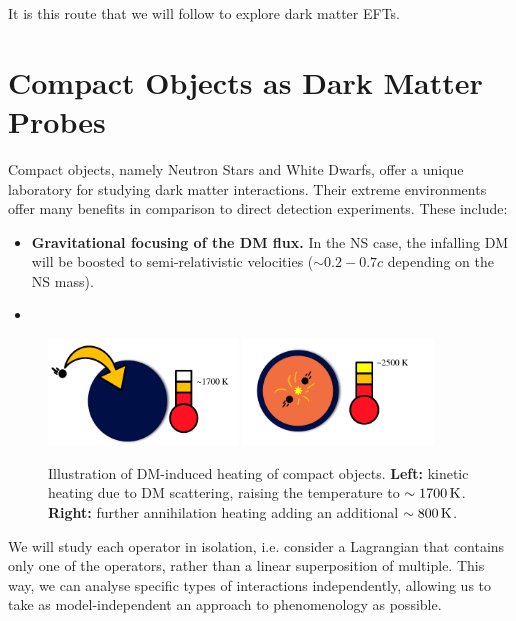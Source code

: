 It is this route that we will follow to explore dark matter EFTs.

\section{Compact Objects as Dark Matter Probes}


Compact objects, namely Neutron Stars and White Dwarfs, offer a unique
laboratory for studying dark matter interactions. Their extreme environments
offer many benefits in comparison to direct detection experiments. 
These include:

\begin{itemize}
\item \textbf{Gravitational focusing of the DM flux.} In the NS case, the 
infalling DM will be boosted to semi-relativistic velocities ($\sim 0.2 - 0.7 c$
depending on the NS mass).
\item 
\end{itemize}


\begin{figure}
    \centering
    \includegraphics[width=0.45\textwidth]{img/chapter_1/kin_heat_NS.pdf}
    \includegraphics[width=0.45\textwidth]{img/chapter_1/ann_heat_NS.pdf}
    \caption{Illustration of DM-induced heating of compact objects. \textbf{Left:} kinetic heating due to DM scattering, raising the temperature to $\sim 1700 {\rm \,K}$. \textbf{Right:} further annihilation heating adding an additional $\sim 800{\rm \,K}$.}
    \label{fig:cartoon_NS_heat}
\end{figure}





We will study each operator in isolation, i.e. consider a Lagrangian that contains only one of the operators, rather than a linear superposition of multiple. This way, we can analyse specific types of interactions independently, allowing us to take as model-independent an approach to phenomenology as possible. 